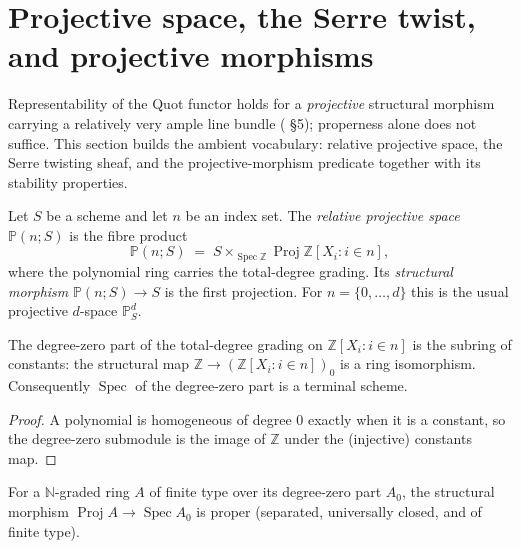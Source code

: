 \section{Projective space, the Serre twist, and projective morphisms}
\label{mk-sec:projective_vocabulary}

Representability of the Quot functor holds for a \emph{projective} structural
morphism carrying a relatively very ample line bundle
(\cite{nitsure-hilbert-quot} \S 5); properness alone does not suffice.  This
section builds the ambient vocabulary: relative projective space, the Serre
twisting sheaf, and the projective-morphism predicate together with its
stability properties.

\begin{definition}
  \label{mk-def:projective_space}
  \leanok
  Let \(S\) be a scheme and let \(n\) be an index set.  The \emph{relative
  projective space} \(\mathbb{P}(n; S)\) is the fibre product
  \[
    \mathbb{P}(n; S) \;=\; S \times_{\operatorname{Spec} \mathbb{Z}}
      \operatorname{Proj} \mathbb{Z}[X_i : i \in n],
  \]
  where the polynomial ring carries the total-degree grading.  Its
  \emph{structural morphism} \(\mathbb{P}(n; S) \to S\) is the first
  projection.  For \(n = \{0, \dots, d\}\) this is the usual projective
  \(d\)-space \(\mathbb{P}^d_S\).
\end{definition}

\begin{lemma}
  \label{mk-lem:projective_space_gradeZero}
  \leanok
  The degree-zero part of the total-degree grading on
  \(\mathbb{Z}[X_i : i \in n]\) is the subring of constants: the structural
  map \(\mathbb{Z} \to (\mathbb{Z}[X_i : i \in n])_0\) is a ring isomorphism.
  Consequently \(\operatorname{Spec}\) of the degree-zero part is a terminal
  scheme.
\end{lemma}

\begin{proof}
  \leanok
  A polynomial is homogeneous of degree \(0\) exactly when it is a constant,
  so the degree-zero submodule is the image of \(\mathbb{Z}\) under the
  (injective) constants map.
\end{proof}

\begin{lemma}
  \label{mk-lem:proj_toSpecZero_proper}
  \mathlibok
  For a \(\mathbb{N}\)-graded ring \(A\) of finite type over its degree-zero
  part \(A_0\), the structural morphism
  \(\operatorname{Proj} A \to \operatorname{Spec} A_0\) is proper (separated,
  universally closed, and of finite type).
\end{lemma}

